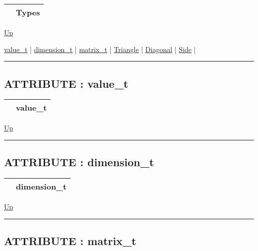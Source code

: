 {\renewcommand{\arraystretch}{1.5}
\begin{tabularx}{\textwidth}{|>{\raggedright\arraybackslash}l|X|}
\hline
\hspace{0pt} & Types \\
\hline
\end{tabularx}
}

\hyperlink{ecldoc:BLAS}{Up}

\par


\hyperlink{ecldoc:blas.types.value_t}{value\_t}  |
\hyperlink{ecldoc:blas.types.dimension_t}{dimension\_t}  |
\hyperlink{ecldoc:blas.types.matrix_t}{matrix\_t}  |
\hyperlink{ecldoc:ecldoc-Triangle}{Triangle}  |
\hyperlink{ecldoc:ecldoc-Diagonal}{Diagonal}  |
\hyperlink{ecldoc:ecldoc-Side}{Side}  |

\rule{\textwidth}{0.4pt}

\subsection*{ATTRIBUTE : value\_t}
\hypertarget{ecldoc:blas.types.value_t}{}

{\renewcommand{\arraystretch}{1.5}
\begin{tabularx}{\textwidth}{|>{\raggedright\arraybackslash}l|X|}
\hline
\hspace{0pt} & value\_t \\
\hline
\end{tabularx}
}

\hyperlink{ecldoc:BLAS.Types}{Up}

\par


\rule{\textwidth}{0.4pt}
\subsection*{ATTRIBUTE : dimension\_t}
\hypertarget{ecldoc:blas.types.dimension_t}{}

{\renewcommand{\arraystretch}{1.5}
\begin{tabularx}{\textwidth}{|>{\raggedright\arraybackslash}l|X|}
\hline
\hspace{0pt} & dimension\_t \\
\hline
\end{tabularx}
}

\hyperlink{ecldoc:BLAS.Types}{Up}

\par


\rule{\textwidth}{0.4pt}
\subsection*{ATTRIBUTE : matrix\_t}
\hypertarget{ecldoc:blas.types.matrix_t}{}

